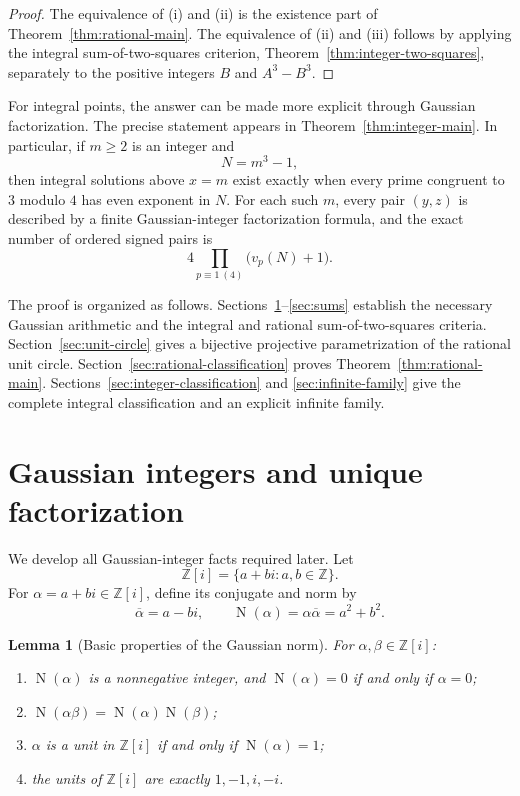 \documentclass[11pt,a4paper]{article}
\numberwithin{equation}{section}
\newtheorem{lemma}[theorem]{Lemma}
\theoremstyle{definition}
\theoremstyle{remark}
\newcommand{\Z}{\mathbb Z}
\newcommand{\Zi}{\Z[i]}
\newcommand{\Norm}{\operatorname{N}}
\begin{document}
\begin{proof}
The equivalence of (i) and (ii) is the existence part of Theorem~\ref{thm:rational-main}. The equivalence of (ii) and (iii) follows by applying the integral sum-of-two-squares criterion, Theorem~\ref{thm:integer-two-squares}, separately to the positive integers $B$ and $A^3-B^3$.
\end{proof}

For integral points, the answer can be made more explicit through Gaussian factorization. The precise statement appears in Theorem~\ref{thm:integer-main}. In particular, if $m\geq2$ is an integer and
\[
 N=m^3-1,
\]
then integral solutions above $x=m$ exist exactly when every prime congruent to $3$ modulo $4$ has even exponent in $N$. For each such $m$, every pair $(y,z)$ is described by a finite Gaussian-integer factorization formula, and the exact number of ordered signed pairs is
\[
 4\prod_{p\equiv1\ (4)}\bigl(v_p(N)+1\bigr).
\]

The proof is organized as follows. Sections~\ref{sec:gaussian}--\ref{sec:sums} establish the necessary Gaussian arithmetic and the integral and rational sum-of-two-squares criteria. Section~\ref{sec:unit-circle} gives a bijective projective parametrization of the rational unit circle. Section~\ref{sec:rational-classification} proves Theorem~\ref{thm:rational-main}. Sections~\ref{sec:integer-classification} and \ref{sec:infinite-family} give the complete integral classification and an explicit infinite family.

\section{Gaussian integers and unique factorization}
\label{sec:gaussian}

We develop all Gaussian-integer facts required later. Let
\[
 \Zi=\{a+bi:a,b\in\Z\}.
\]
For $\alpha=a+bi\in\Zi$, define its conjugate and norm by
\[
 \overline\alpha=a-bi,
 \qquad
 \Norm(\alpha)=\alpha\overline\alpha=a^2+b^2.
\]

\begin{lemma}[Basic properties of the Gaussian norm]
\label{lem:norm-basic}
For $\alpha,\beta\in\Zi$:
\begin{enumerate}[label=\textup{(\alph*)}]
 \item $\Norm(\alpha)$ is a nonnegative integer, and $\Norm(\alpha)=0$ if and only if $\alpha=0$;
 \item $\Norm(\alpha\beta)=\Norm(\alpha)\Norm(\beta)$;
 \item $\alpha$ is a unit in $\Zi$ if and only if $\Norm(\alpha)=1$;
 \item the units of $\Zi$ are exactly $1,-1,i,-i$.
\end{enumerate}
\end{lemma}
\end{document}
